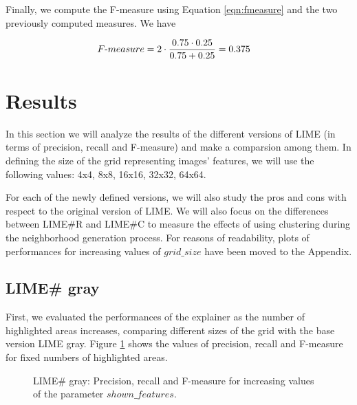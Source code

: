 \documentclass[12pt, twoside, a4paper]{report}
\begin{document}
Finally, we compute the F-measure using Equation \ref{eqn:fmeasure} and the two previously computed measures. We have

\begin{align*}
F\textnormal{-}measure 
&= 2 \cdot \frac{0.75 \cdot 0.25}{0.75 + 0.25} = 0.375
\end{align*}

\section{Results}

In this section we will analyze the results of the different versions of LIME (in terms of precision, recall and F-measure) and make a comparsion among them. In defining the size of the grid representing images' features, we will use the following values: 4x4, 8x8, 16x16, 32x32, 64x64.

For each of the newly defined versions, we will also study the pros and cons with respect to the original version of LIME. We will also focus on the differences between LIME\#R and LIME\#C to measure the effects of using clustering during the neighborhood generation process. For reasons of readability, plots of performances for increasing values of $grid\_size$ have been moved to the Appendix.

\subsection{LIME\# gray}

First, we evaluated the performances of the explainer as the number of highlighted areas increases, comparing different sizes of the grid with the base version LIME gray. Figure \ref{subfig:limesharp_gray_vs_sf} shows the values of precision, recall and F-measure for fixed numbers of highlighted areas. 


\begin{figure}
\centering


\hspace{-4mm} 
\caption{LIME\# gray: Precision, recall and F-measure for increasing values of the parameter $shown\_features$.}
\label{subfig:limesharp_gray_vs_sf}
\end{figure}
\end{document}
